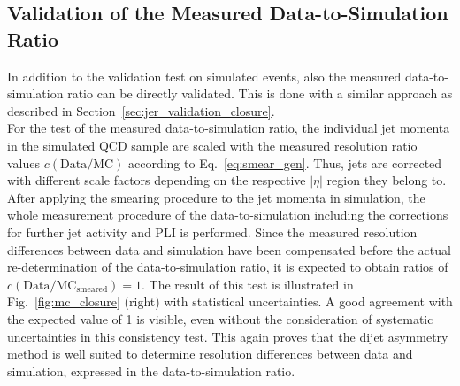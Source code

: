\subsection{Validation of the Measured Data-to-Simulation Ratio}
\label{sec:jer_validation_ratio}
In addition to the validation test on simulated events, also the measured data-to-simulation ratio can be directly validated. This is done with a similar approach as described in Section~\ref{sec:jer_validation_closure}.\\
For the test of the measured data-to-simulation ratio, the individual jet momenta in the simulated \pythia QCD sample are scaled with the measured resolution ratio values $c{(\mathrm{Data}/\mathrm{MC})}$ according to Eq.~\ref{eq:smear_gen}. Thus, jets are corrected with different scale factors depending on the respective $|\eta|$ region they belong to. After applying the smearing procedure to the jet momenta in simulation, the whole measurement procedure of the data-to-simulation including the corrections for further jet activity and PLI is performed. Since the measured resolution differences between data and simulation have been compensated before the actual re-determination of the data-to-simulation ratio, it is expected to obtain ratios of $c\mathrm{(Data/MC_{smeared})} = 1$. The result of this test is illustrated in Fig.~\ref{fig:mc_closure} (right) with statistical uncertainties. A good agreement with the expected value of 1 is visible, even without the consideration of systematic uncertainties in this consistency test. This again proves that the dijet asymmetry method is well suited to determine resolution differences between data and simulation, expressed in the data-to-simulation ratio. 

